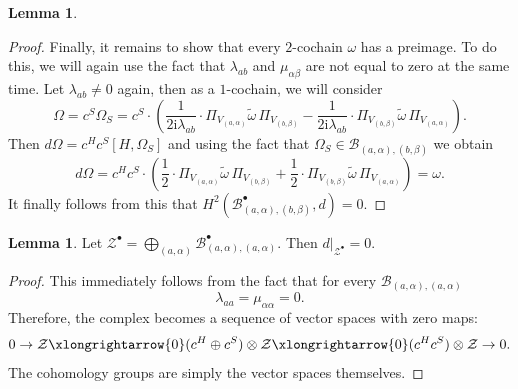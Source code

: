 \documentclass[10pt,a4paper]{amsart}
\theoremstyle{definition}
\newtheorem{lemma}[remark]{Lemma}
\begin{document}
\begin{lemma}
\begin{proof}
        Finally, it remains to show that every $2$-cochain $\omega$ has a preimage. To do this, we will again use the fact that $\lambda_{ab}$ and $\mu_{\alpha\beta}$ are not equal to zero at the same time. Let $\lambda_{ab}\neq 0$ again, then as a $1$-cochain, we will consider
        \begin{equation}
            \Omega=c^{S}\Omega_{S}=c^{S}\cdot\left(\frac{1}{2\mathrm{i}\lambda_{ab}}\cdot \Pi_{V_{(a,\alpha)}}\tilde{\omega}\,\Pi_{V_{(b,\beta)}}-\frac{1}{2\mathrm{i}\lambda_{ab}}\cdot \Pi_{V_{(b,\beta)}}\tilde{\omega}\,\Pi_{V_{(a,\alpha)}}\right).
        \end{equation}
        Then $d\Omega=c^{H}c^{S}[H,\Omega_{S}]$ and using the fact that $\Omega_{S}\in\mathcal{B}_{(a,\alpha),(b,\beta)}$ we obtain
        \begin{equation}
            d\Omega=c^{H}c^{S}\cdot\left(\frac{1}{2}\cdot \Pi_{V_{(a,\alpha)}}\tilde{\omega}\,\Pi_{V_{(b,\beta)}}+\frac{1}{2}\cdot \Pi_{V_{(b,\beta)}}\tilde{\omega}\,\Pi_{V_{(a,\alpha)}}\right)=\omega.
        \end{equation}
        It finally follows from this that $H^{2}(\mathcal{B}^{\bullet}_{(a,\alpha),(b,\beta)},d)=0$.
        \end{proof}
\end{lemma}
\begin{lemma} \label{prop:zero-diff}
    Let $\mathcal{Z}^{\bullet}=\bigoplus_{(a,\alpha)}\mathcal{B}_{(a,\alpha),(a,\alpha)}^{\bullet}$. Then $d|_{\mathcal{Z}^{\bullet}}=0$.
    \begin{proof}
        This immediately follows from the fact that for every $\mathcal{B}_{(a,\alpha),(a,\alpha)}$
        \begin{equation}
            \lambda_{aa}=\mu_{\alpha\alpha}=0.
        \end{equation}
        Therefore, the complex becomes a sequence of vector spaces with zero maps:
        \begin{equation}
            0\rightarrow\mathcal{Z}\xlongrightarrow{0}(c^H\oplus c^S)\otimes\mathcal{Z}\xlongrightarrow{0}(c^H c^S)\otimes\mathcal{Z}\rightarrow 0.
        \end{equation}
        The cohomology groups are simply the vector spaces themselves.
    \end{proof}
\end{lemma}
\end{document}

